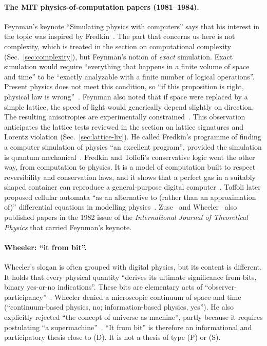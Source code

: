 \paragraph{The MIT physics-of-computation papers (1981--1984).} Feynman's
keynote ``Simulating physics with computers'' says that his interest in the
topic was inspired by Fredkin~\cite{Feynman1982simulating}. The part that
concerns us here is not complexity, which is treated in the section on
computational complexity (Sec.~\ref{sec:complexity}),
{} but Feynman's notion of \emph{exact} simulation. Exact simulation would
require ``everything that happens in a finite volume of space and time'' to be
``exactly analyzable with a finite number of logical operations''. Present
physics does not meet this condition, so ``if this proposition is right,
physical law is wrong''~\cite{Feynman1982simulating}. Feynman also noted that
if space were replaced by a simple lattice, the speed of light would generically
depend slightly on direction. The resulting anisotropies are experimentally
constrained~\cite{Feynman1982simulating}. This observation anticipates the
lattice tests reviewed in the section on lattice signatures and Lorentz
violation (Sec.~\ref{sec:lattice-liv}).
He called Fredkin's programme of finding a computer simulation of physics ``an
excellent program'', provided the simulation is quantum
mechanical~\cite{Feynman1982simulating}. Fredkin and Toffoli's conservative
logic went the other way, from computation to physics. It is a model of
computation built to respect reversibility and conservation laws, and it shows
that a perfect gas in a suitably shaped container can reproduce a
general-purpose digital computer~\cite{Fredkin1982conservative}. Toffoli later
proposed cellular automata ``as an alternative to (rather than an approximation
of)'' differential equations in modelling physics~\cite{Toffoli1984cellular}.
Zuse~\cite{Zuse1982computing} and Wheeler~\cite{Wheeler1982computer} also
published papers in the 1982 issue of the \emph{International Journal of
Theoretical Physics} that carried Feynman's keynote.

\paragraph{Wheeler: ``it from bit''.} Wheeler's slogan is often grouped with
digital physics, but its content is different. It holds that every physical
quantity ``derives its ultimate significance from bits, binary yes-or-no
indications''. These bits are elementary acts of
``observer-participancy''~\cite{Wheeler1990information}. Wheeler denied a
microscopic continuum of space and time (``continuum-based physics, no;
information-based physics, yes''). He also explicitly rejected ``the concept of
universe as machine'', partly because it requires postulating ``a
supermachine''~\cite{Wheeler1990information}. ``It from bit'' is therefore an
informational and participatory thesis close to (D). It is not a thesis of
type (P) or (S).

